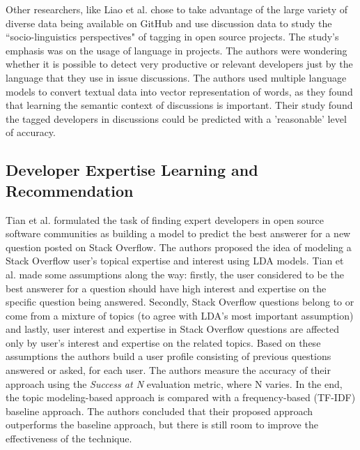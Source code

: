         Other researchers, like Liao et al. \cite{liao2019status} chose to take advantage of the large variety of diverse data being available on GitHub and use discussion data to study the ``socio-linguistics perspectives" of tagging in open source projects. The study's emphasis was on the usage of language in projects. The authors were wondering whether it is possible to detect very productive or relevant developers just by the language that they use in issue discussions. The authors used multiple language models to convert textual data into vector representation of words, as they found that learning the semantic context of discussions is important. Their study found the tagged developers in discussions could be predicted with a 'reasonable' level of accuracy.

    \subsection{Developer Expertise Learning and Recommendation\label{RW:expertise}}
        Tian et al. \cite{tian2013predicting} formulated the task of finding expert developers in open source software communities as building a model to predict the best answerer for a new question posted on Stack Overflow. The authors proposed the idea of modeling a Stack Overflow user's topical expertise and interest using LDA models. Tian et al. made some assumptions along the way: firstly, the user considered to be the best answerer for a question should have high interest and expertise on the specific question being answered. Secondly, Stack Overflow questions belong to or come from a mixture of topics (to agree with LDA's most important assumption) and lastly, user interest and expertise in Stack Overflow questions are affected only by user's interest and expertise on the related topics. Based on these assumptions the authors build a user profile consisting of previous questions answered or asked, for each user. The authors measure the accuracy of their approach using the \emph{Success at N} evaluation metric, where N varies. In the end, the topic modeling-based approach is compared with a frequency-based (TF-IDF) baseline approach. The authors concluded that their proposed approach outperforms the baseline approach, but there is still room to improve the effectiveness of the technique.
        
